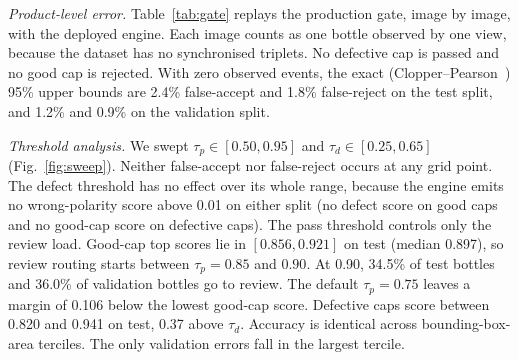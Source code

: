 \documentclass[conference]{IEEEtran}
\begin{document}
\textit{Product-level error.} Table~\ref{tab:gate} replays the production gate, image by image, with the deployed engine. Each image counts as one bottle observed by one view, because the dataset has no synchronised triplets. No defective cap is passed and no good cap is rejected. With zero observed events, the exact (Clopper--Pearson~\cite{clopper1934}) 95\% upper bounds are 2.4\% false-accept and 1.8\% false-reject on the test split, and 1.2\% and 0.9\% on the validation split.

\begin{table}[t]
\caption{Production gate replayed with the FP16 engine (one view per bottle; defaults $\tau_p{=}0.75$, $\tau_d{=}0.45$, $\tau_u{=}0.40$)}
\label{tab:gate}
\centering
\setlength{\tabcolsep}{4pt}
\end{table}

\textit{Threshold analysis.} We swept $\tau_p\in[0.50,0.95]$ and $\tau_d\in[0.25,0.65]$ (Fig.~\ref{fig:sweep}). Neither false-accept nor false-reject occurs at any grid point. The defect threshold has no effect over its whole range, because the engine emits no wrong-polarity score above 0.01 on either split (no defect score on good caps and no good-cap score on defective caps). The pass threshold controls only the review load. Good-cap top scores lie in $[0.856, 0.921]$ on test (median 0.897), so review routing starts between $\tau_p{=}0.85$ and $0.90$. At 0.90, 34.5\% of test bottles and 36.0\% of validation bottles go to review. The default $\tau_p{=}0.75$ leaves a margin of 0.106 below the lowest good-cap score. Defective caps score between 0.820 and 0.941 on test, 0.37 above $\tau_d$. Accuracy is identical across bounding-box-area terciles. The only validation errors fall in the largest tercile.
\end{document}
